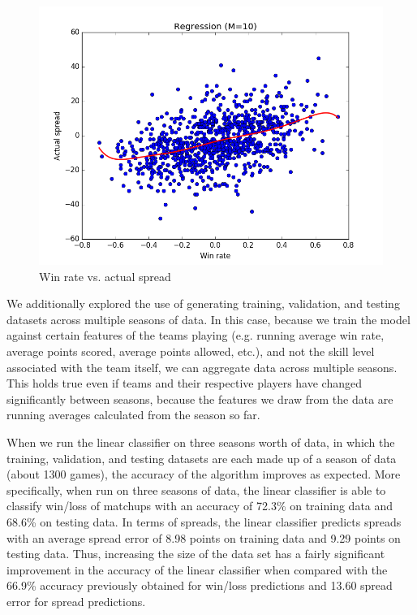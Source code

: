 \documentclass{article}
\begin{document}
\begin{figure}[width=\linewidth]
\begin{multicols}{2}
  \includegraphics[width=1.2\linewidth]{code/figures/linear_regression(m=10).png}
\end{multicols}
\caption{Win rate vs. actual spread}
\end{figure}

We additionally explored the use of generating training, validation, and testing datasets across multiple seasons of data. In this case, because we train the model against certain features of the teams playing (e.g. running average win rate, average points scored, average points allowed, etc.), and not the skill level associated with the team itself, we can aggregate data across multiple seasons. This holds true even if teams and their respective players have changed significantly between seasons, because the features we draw from the data are running averages calculated from the season so far.

When we run the linear classifier on three seasons worth of data, in which the training, validation, and testing datasets are each made up of a season of data (about 1300 games), the accuracy of the algorithm improves as expected. More specifically, when run on three seasons of data, the linear classifier is able to classify win/loss of matchups with an accuracy of 72.3\% on training data and 68.6\% on testing data. In terms of spreads, the linear classifier predicts spreads with an average spread error of 8.98 points on training data and 9.29 points on testing data. Thus, increasing the size of the data set has a fairly significant improvement in the accuracy of the linear classifier when compared with the 66.9\% accuracy previously obtained for win/loss predictions and 13.60 spread error for spread predictions.
\end{document}
